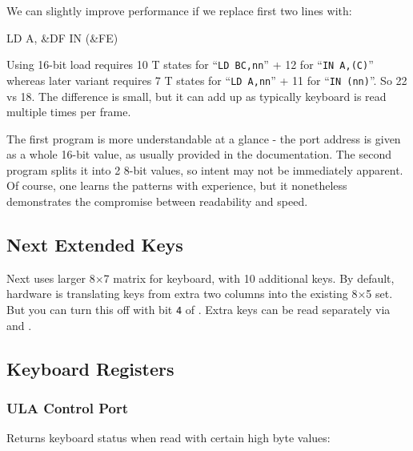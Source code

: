 We can slightly improve performance if we replace first two lines with:

\begin{tcblisting}{}
	LD A, &DF
	IN (&FE)
\end{tcblisting}

Using 16-bit load requires 10 T states for ``{\tt LD BC,nn}'' + 12 for ``{\tt IN A,(C)}'' whereas later variant requires 7 T states for ``{\tt LD A,nn}'' + 11 for ``{\tt IN (nn)}''. So 22 vs 18. The difference is small, but it can add up as typically keyboard is read multiple times per frame.

The first program is more understandable at a glance - the port address is given as a whole 16-bit value, as usually provided in the documentation. The second program splits it into 2 8-bit values, so intent may not be immediately apparent. Of course, one learns the patterns with experience, but it nonetheless demonstrates the compromise between readability and speed.


\subsection{Next Extended Keys}

Next uses larger 8$\times$7 matrix for keyboard, with 10 additional keys. By default, hardware is translating keys from extra two columns into the existing 8$\times$5 set. But you can turn this off with bit {\tt 4} of . Extra keys can be read separately via  and .


\subsection{Keyboard Registers}
\label{zx_next_keyboard_registers}

\subsubsection{ULA Control Port }

\vspace*{-1em} %
Returns keyboard status when read with certain high byte values:

